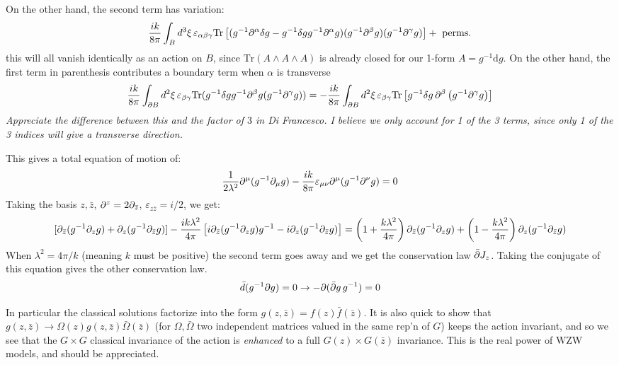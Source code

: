 \documentclass[11pt]{article}
\begin{document}
\begin{enumerate}
	On the other hand, the second term has variation:
	\[
		\frac{i k}{8 \pi} \int_B d^3 \xi \, \varepsilon_{\alpha \beta \gamma} \mathrm{Tr}\left[(g^{-1} \partial^\alpha \delta g - g^{-1} \delta g g^{-1} \partial^\alpha g) (g^{-1} \partial^\beta g) (g^{-1} \partial^\gamma g) \right] + \text{ perms.}
	\]
	this will all vanish identically as an action on $B$, since $\mathrm{Tr}(A \wedge A \wedge A)$ is already closed for our 1-form $A = g^{-1} \mathrm{d} g$. On the other hand, the first term in parenthesis contributes a boundary term when $\alpha$ is transverse 
	\[
		\frac{i k}{8\pi} \int_{\partial B} d^2 \xi\, \varepsilon_{\beta \gamma} \mathrm{Tr}(g^{-1} \delta g g^{-1} \partial^\beta g (g^{-1} \partial^\gamma g))
		 = -\frac{i k}{8\pi} \int_{\partial B} d^2 \xi\, \varepsilon_{\beta \gamma} \mathrm{Tr}\left[g^{-1} \delta g \, \partial^\beta \left( g^{-1}  \partial^\gamma g \right) \right]
	\]
		\emph{Appreciate the difference between this and the factor of $3$ in Di Francesco. I believe we only account for 1 of the 3 terms, since only 1 of the 3 indices will give a transverse direction.}
		
	This gives a total equation of motion of:
	\begin{equation}
		\frac{1}{2\lambda^2} \partial^\mu(g^{-1} \partial_\mu g) - \frac{i k}{8 \pi} \varepsilon_{\mu \nu} \partial^\mu(g^{-1} \partial^\nu g) = 0
	\end{equation}
	Taking the basis $z, \bar z$, $\partial^z = 2 \partial_{\bar z}$, $\varepsilon_{z \bar z} = i/2$, we get:
	\[
		[\partial_{\bar z} (g^{-1} \partial_z g) + \partial_{z} (g^{-1} \partial_{\bar z} g)] - \frac{i k \lambda^2}{4 \pi} \left[i \partial_{\bar z} (g^{-1} \partial_z g) g^{-1} - i \partial_z (g^{-1} \partial_{\bar z} g) \right] = \left(1 + \frac{k \lambda^2}{4\pi}\right) \partial_{\bar z} (g^{-1} \partial_z g) + \left(1 - \frac{k \lambda^2}{4\pi} \right) \partial_{z} (g^{-1} \partial_{\bar z} g)
	\]
	When $\lambda^2 = 4\pi/k$ (meaning $k$ must be positive) the second term goes away and we get the conservation law $\bar {\partial} J_z$. Taking the conjugate of this equation gives the other conservation law. 
	\[
		\bar d (g^{-1} \partial g) = 0 \to - \partial(\bar {\partial} g \, g^{-1}) = 0
	\]
	
	In particular the classical solutions factorize into the form $g(z, \bar z) = f(z) \bar f(\bar z)$. It is also quick to show that $g(z, \bar z) \to \Omega(z) g(z, \bar z) \bar \Omega (\bar z)$ (for $\Omega, \bar \Omega$ two independent matrices valued in the same rep'n of $G$) keeps the action invariant, and so we see that the $G \times G$ classical invariance of the action is \emph{enhanced} to a full $G(z) \times G(\bar z)$ invariance. This is the real power of WZW models, and should be appreciated.
	

\end{enumerate}
\end{document}
